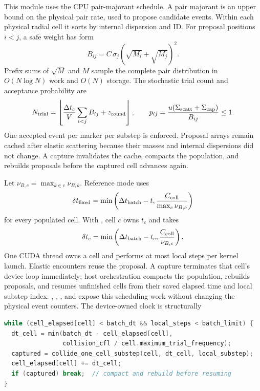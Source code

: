 This module uses the CPU
 pair-majorant schedule. A pair majorant is
an upper bound on the physical pair rate, used to propose candidate events.  Within each
physical radial cell it sorts by internal dispersion and ID.  For proposal
positions \(i<j\), a safe weight has form
\begin{equation}
 B_{ij}=C\,\sigma_j(\sqrt{M_i}+\sqrt{M_j})^2.
\end{equation}
Prefix sums of \(\sqrt M\) and \(M\) sample the complete pair distribution in
\(O(N\log N)\) work and \(O(N)\) storage.  The stochastic trial count and
acceptance probability are
\begin{equation}
 N_{\rm trial}=\left\lfloor
 \frac{\Delta t_c}{V}\sum_{i<j}B_{ij}+z_{\rm round}
 \right\rfloor,
 \qquad
 p_{ij}=\frac{u(\Sigma_{\rm scatt}+\Sigma_{\rm cap})}{B_{ij}}\le1.
\end{equation}
One accepted event per marker per substep is enforced.  Proposal arrays remain
cached after elastic scattering because their masses and internal dispersions
did not change.  A capture invalidates the cache, compacts the population, and
rebuilds proposals before the captured cell advances again.

Let \(\nu_{B,c}=\max_{k\in c}\nu_{B,k}\).  Reference mode uses
\begin{equation}
 \delta t_{\rm fixed}=\min\left(
 \Delta t_{\rm batch}-t,
 \frac{C_{\rm coll}}{\max_c\nu_{B,c}}\right)
\end{equation}
for every populated cell.  With , cell
\(c\) owns \(t_c\) and takes
\begin{equation}
 \delta t_c=\min\left(
 \Delta t_{\rm batch}-t_c,
 \frac{C_{\rm coll}}{\nu_{B,c}}\right).
\end{equation}
One CUDA thread owns a cell and performs at most
 local steps per kernel launch.
Elastic encounters reuse the proposal.  A capture terminates that cell's
device loop immediately; host orchestration compacts the population, rebuilds
proposals, and resumes unfinished cells from their saved elapsed time and
local substep index.  , ,
, and  expose this scheduling
work without changing the physical event counters.
The device-owned clock is structurally
\par\noindent\begin{minipage}{\linewidth}
\begin{lstlisting}[language=C++]
while (cell_elapsed[cell] < batch_dt && local_steps < batch_limit) {
  dt_cell = min(batch_dt - cell_elapsed[cell],
                collision_cfl / cell.maximum_trial_frequency);
  captured = collide_one_cell_substep(cell, dt_cell, local_substep);
  cell_elapsed[cell] += dt_cell;
  if (captured) break;  // compact and rebuild before resuming
}
\end{lstlisting}
\end{minipage}

